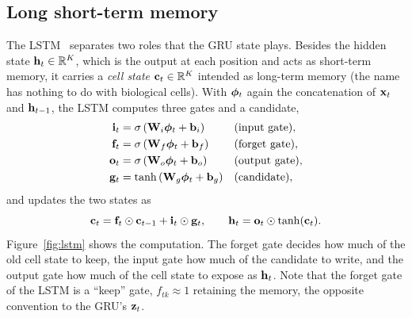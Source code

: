 \subsection{Long short-term memory}

The LSTM~\citep{hochreiter1997lstm,gers2000} separates two roles that the GRU state plays. Besides the hidden state $\mathbf{h}_t\in\mathbb{R}^K$, which is the output at each position and acts as short-term memory, it carries a \emph{cell state} $\mathbf{c}_t\in\mathbb{R}^K$ intended as long-term memory (the name has nothing to do with biological cells). With $\boldsymbol{\phi}_t$ again the concatenation of $\mathbf{x}_t$ and $\mathbf{h}_{t-1}$, the LSTM computes three gates and a candidate,
\begin{align}
  \mathbf{i}_t &= \sigma\left(\mathbf{W}_i\boldsymbol{\phi}_t+\mathbf{b}_i\right) && \text{(input gate)},\\
  \mathbf{f}_t &= \sigma\left(\mathbf{W}_f\boldsymbol{\phi}_t+\mathbf{b}_f\right) && \text{(forget gate)},\\
  \mathbf{o}_t &= \sigma\left(\mathbf{W}_o\boldsymbol{\phi}_t+\mathbf{b}_o\right) && \text{(output gate)},\\
  \mathbf{g}_t &= \tanh\left(\mathbf{W}_g\boldsymbol{\phi}_t+\mathbf{b}_g\right) && \text{(candidate)},
\end{align}
and updates the two states as
\begin{equation}
  \mathbf{c}_t = \mathbf{f}_t\odot\mathbf{c}_{t-1} + \mathbf{i}_t\odot\mathbf{g}_t, \qquad \mathbf{h}_t = \mathbf{o}_t\odot\tanh(\mathbf{c}_t).
  \label{eq:lstm}
\end{equation}
Figure~\ref{fig:lstm} shows the computation. The forget gate decides how much of the old cell state to keep, the input gate how much of the candidate to write, and the output gate how much of the cell state to expose as $\mathbf{h}_t$. Note that the forget gate of the LSTM is a ``keep'' gate, $f_{tk}\approx1$ retaining the memory, the opposite convention to the GRU's $\mathbf{z}_t$.

